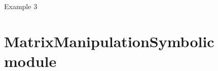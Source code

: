 \documentclass[letterpaper,10pt,english,openany,oneside]{sphinxmanual}
\begin{document}

\begin{fulllineitems}
\label{\detokenize{MatrixManipulation:MatrixManipulation.main}}
Example 3

\end{fulllineitems}



\chapter{MatrixManipulationSymbolic module}
\label{\detokenize{MatrixManipulationSymbolic:module-MatrixManipulationSymbolic}}\label{\detokenize{MatrixManipulationSymbolic::doc}}\label{\detokenize{MatrixManipulationSymbolic:matrixmanipulationsymbolic-module}}
\end{document}
